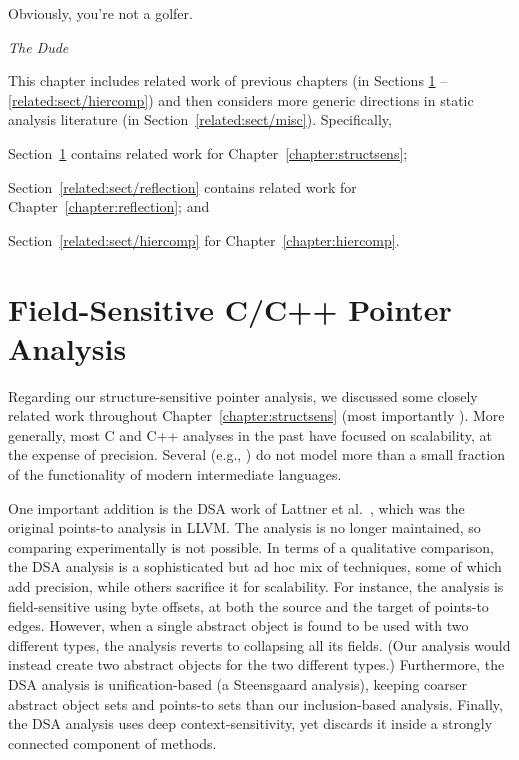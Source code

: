 \label{chapter:related}
\epigraph{Obviously, you're not a golfer.}{\textit{The Dude}}

This chapter includes related work of previous chapters (in Sections
\ref{related:sect/structsens} -- \ref{related:sect/hiercomp})
and then considers more generic directions in static analysis
literature (in Section~\ref{related:sect/misc}).
%
Specifically,
\begin{inparaenum}[(a)]
\item Section~\ref{related:sect/structsens} contains related work for
  Chapter~\ref{chapter:structsens};
\item Section~\ref{related:sect/reflection} contains related work for
  Chapter~\ref{chapter:reflection}; and
\item Section~\ref{related:sect/hiercomp} for
  Chapter~\ref{chapter:hiercomp}.
\end{inparaenum}

\section{Field-Sensitive C/C++ Pointer Analysis}
\label{related:sect/structsens}

Regarding our structure-sensitive pointer analysis, we discussed some
closely related work throughout Chapter~\ref{chapter:structsens} (most
importantly \cite{paste/PearceKH04,toplas/PearceKH07}). More
generally, most C and C++ analyses in the past have focused on
scalability, at the expense of precision. Several (e.g.,
\cite{antgrasshopper,popl/ZhengR08,popl/Lhotak11}) do not model more
than a small fraction of the functionality of modern intermediate
languages.

One important addition is the DSA work of Lattner et
al.~\cite{pldi/LattnerLA07}, which was the original points-to analysis
in LLVM. The analysis is no longer maintained, so comparing
experimentally is not possible. In terms of a qualitative comparison,
the DSA analysis is a sophisticated but ad hoc mix of techniques, some
of which add precision, while others sacrifice it for scalability. For
instance, the analysis is field-sensitive using byte offsets, at both
the source and the target of points-to edges. However, when a single
abstract object is found to be used with two different types, the
analysis reverts to collapsing all its fields. (Our analysis would
instead create two abstract objects for the two different types.)
Furthermore, the DSA analysis is unification-based (a Steensgaard
analysis), keeping coarser abstract object sets and points-to sets
than our inclusion-based analysis. Finally, the DSA analysis uses deep
context-sensitivity, yet discards it inside a strongly connected
component of methods.

